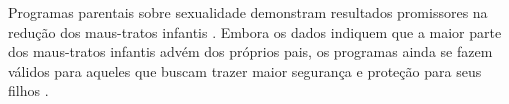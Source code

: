 










Programas parentais sobre sexualidade demonstram resultados promissores na redução dos maus-tratos infantis \cite{silverman2008evidence}. Embora os dados indiquem que a maior parte dos maus-tratos infantis advém dos próprios pais, os programas ainda se fazem válidos para aqueles que buscam trazer maior segurança e proteção para seus filhos \cite{pelisoli2010prevenccao}.


  
